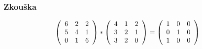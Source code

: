 \documentclass[a4paper]{article}
\begin{document}
\subsubsection{Zkouška}
\begin{equation*}
\left(
\begin{array}{c c c}
    6 & 2 & 2\\
    5 & 4 & 1\\
    0 & 1 & 6
\end{array}
\right)
*
\left(
\begin{array}{c c c}
    4 & 1 & 2\\
    3 & 2 & 1\\
    3 & 2 & 0
\end{array}
\right)
=
\left(
\begin{array}{c c c}
    1 & 0 & 0\\
    0 & 1 & 0\\
    1 & 0 & 0
\end{array}
\right)
\end{equation*}
\end{document}
